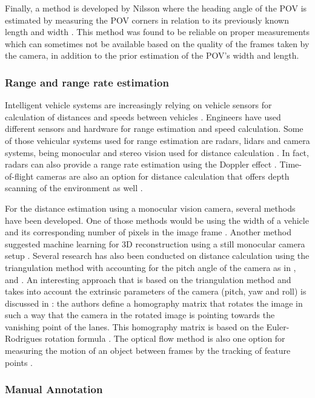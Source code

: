 Finally, a method is developed by Nilsson where the heading angle of the POV is estimated by measuring the POV corners in relation to its previously known length and width \cite{nilsson2018}. This method was found to be reliable on proper measurements which can sometimes not be available based on the quality of the frames taken by the camera, in addition to the prior estimation of the POV's width and length.

\subsubsection{Range and range rate estimation}
Intelligent vehicle systems are increasingly relying on vehicle sensors for calculation of distances and speeds between vehicles \cite{IVSsurvey}. Engineers have used different sensors and hardware for range estimation and speed calculation. Some of those vehicular systems used for range estimation are radars, lidars and camera systems, being monocular and stereo vision used for distance calculation \cite{radarLidarCamera}. In fact, radars can also provide a range rate estimation using the Doppler effect \cite{radarDoppler}. Time-of-flight cameras are also an option for distance calculation that offers depth scanning of the environment as well \cite{timeofflightcam}.

For the distance estimation using a monocular vision camera, several methods have been developed. One of those methods would be using the width of a vehicle and its corresponding number of pixels in the image frame \cite{nilsson2018}. Another method suggested machine learning for 3D reconstruction using a still monocular camera setup \cite{Saxena2008}. Several research has also been conducted on distance calculation using the triangulation method with accounting for the pitch angle of the camera as in \cite{triangulation1}, \cite{alizadeh2015object} and \cite{triangulation2}. An interesting approach that is based on the triangulation method and takes into account the extrinsic parameters of the camera (pitch, yaw and roll) is discussed in \cite{SLee2012}: the authors define a homography matrix that rotates the image in such a way that the camera in the rotated image is pointing towards the vanishing point of the lanes. This homography matrix is based on the Euler-Rodrigues rotation formula \cite{Palais2007}. The optical flow method is also one option for measuring the motion of an object between frames by the tracking of feature points \cite{meng2016tool}.

\subsubsection{Manual Annotation}

